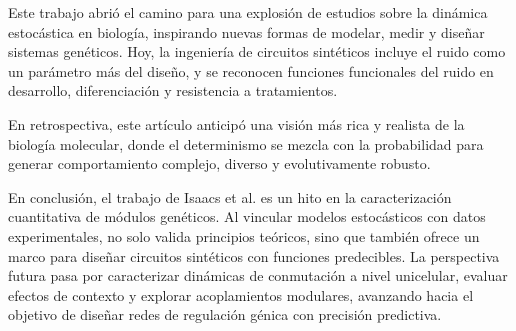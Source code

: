 \documentclass[nochap]{config/ejercicios}
\begin{document}

Este trabajo abrió el camino para una explosión de estudios sobre la dinámica estocástica en biología, inspirando nuevas formas de modelar, medir y diseñar sistemas genéticos. Hoy, la ingeniería de circuitos sintéticos incluye el ruido como un parámetro más del diseño, y se reconocen funciones funcionales del ruido en desarrollo, diferenciación y resistencia a tratamientos.

En retrospectiva, este artículo anticipó una visión más rica y realista de la biología molecular, donde el determinismo se mezcla con la probabilidad para generar comportamiento complejo, diverso y evolutivamente robusto.


En conclusión, el trabajo de Isaacs et al. es un hito en la caracterización cuantitativa de módulos genéticos. Al vincular modelos estocásticos con datos experimentales, no solo valida principios teóricos, sino que también ofrece un marco para diseñar circuitos sintéticos con funciones predecibles. La perspectiva futura pasa por caracterizar dinámicas de conmutación a nivel unicelular, evaluar efectos de contexto y explorar acoplamientos modulares, avanzando hacia el objetivo de diseñar redes de regulación génica con precisión predictiva.
\end{document}
